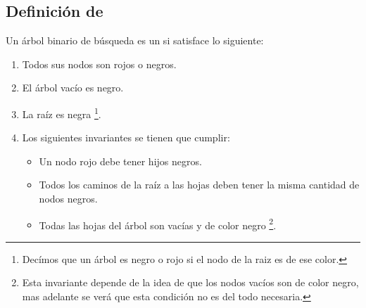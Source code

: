\subsection{Definici\'on de {\arns}}
Un \'arbol binario de búsqueda es un {\arn} si satisface lo siguiente:
\begin{enumerate}
    \item Todos sus nodos son rojos o negros.
    \item El \'arbol vac\'io es negro.
    \item La ra\'iz es negra \footnote{Dec\'imos que un \'arbol es negro o rojo si el nodo de la
    raiz es de ese color.}.
    \item Los siguientes invariantes se tienen que cumplir:
    \begin{itemize}
        \item Un nodo rojo debe tener hijos negros.
        \item Todos los caminos de la raíz a las hojas deben tener la misma cantidad de nodos
        negros.
        \item Todas las hojas del \'arbol son vacías y de color negro \footnote{Esta invariante
        depende de la idea de que los nodos vacíos son de color negro, mas adelante se ver\'a que
        esta condici\'on no es del todo necesaria.}.
    \end{itemize}
\end{enumerate}

\begin{figure}
\centering
\captionsetup{justification=centering}
\caption {\Arn}
\label{arbolRB_1}
\end{figure}

